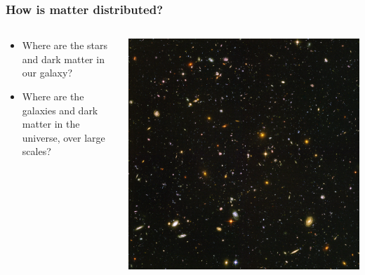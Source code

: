 \documentclass{beamer}
\begin{document}
\frame
{

    \frametitle{How is matter distributed?}


    \begin{columns}
        \begin{column}{0.5\textwidth}
            \begin{itemize}


                \item Where are the stars and dark matter in our galaxy?

                \item Where are the galaxies and dark matter in the universe,
                    over large scales?


            \end{itemize}
        \end{column}
        \begin{column}{0.5\textwidth}
            \begin{center}
                \includegraphics[width=\textwidth]{UDF_half.jpg}
            \end{center}
        \end{column}
    \end{columns}


}
\end{document}
